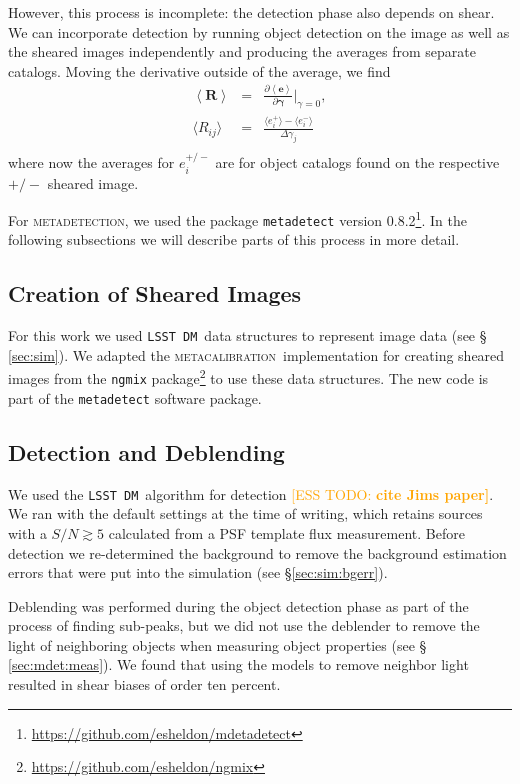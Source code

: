 \documentclass[twocolumn,twocolappendix,astrosym]{openjournal}
\newcommand{\esstodo}[1]{\textcolor{orange}{[ESS TODO: \bf #1]}}
\newcommand{\dm}{\texttt{LSST DM}}
\newcommand{\mcal}{\textsc{metacalibration}}
\newcommand{\mdet}{\textsc{metadetection}}
\begin{document}
However, this process is incomplete:  the detection phase also depends on
shear.  We can incorporate detection by running object detection on the image
as well as the sheared images independently and producing the averages from
separate catalogs.  Moving the derivative outside of the average, we find
\begin{eqnarray} \label{eq:fullR}
    \left< \boldsymbol{R} \right> &=& \frac{\partial \left< \boldsymbol{e} \right> }{\partial \boldsymbol{\gamma} } \biggr\rvert_{\gamma=0},  \nonumber \\
    \langle R_{ij}\rangle &=& \frac{\langle e_i^{+}\rangle - \langle e_i^{-}\rangle}{\Delta\gamma_j} \nonumber \\
\end{eqnarray}
where now the averages for $e_i^{+/-}$ are for object catalogs found on the
respective ${+/-}$ sheared image.

For \mdet, we used the package \texttt{metadetect} version
0.8.2\footnote{\url{https://github.com/esheldon/mdetadetect}}.  In the following subsections
we will describe parts of this process in more detail.

\subsection{Creation of Sheared Images} \label{sec:mdet:sheared}

For this work we used \dm\ data structures to represent image data (see \S
\ref{sec:sim}).  We adapted the \mcal\ implementation for creating sheared
images from the \texttt{ngmix}
package\footnote{\url{https://github.com/esheldon/ngmix}} to use these data
structures.  The new code is part of the \texttt{metadetect} software package.


\subsection{Detection and Deblending} \label{sec:mdet:detect}

We used the \dm\ algorithm for detection \esstodo{cite Jims paper}.  We ran with
the default settings at the time of writing, which retains sources with a
$S/N \gtrsim 5$ calculated from a PSF template flux measurement.  Before detection
we re-determined the background to remove the background estimation errors that were
put into the simulation (see \S \ref{sec:sim:bgerr}).

Deblending was performed during the object detection phase as part of the
process of finding sub-peaks, but we did not use the deblender to remove the
light of neighboring objects when measuring object properties (see \S
\ref{sec:mdet:meas}).  We found that using the models to remove neighbor light
resulted in shear biases of order ten percent.
\end{document}
